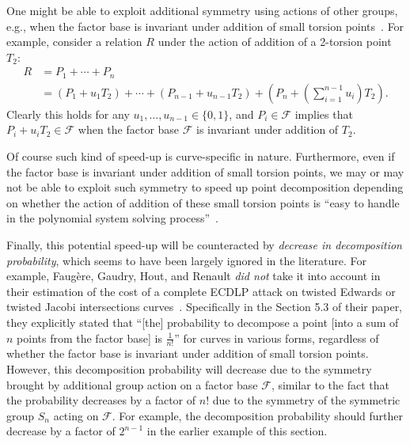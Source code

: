 One might be able to exploit additional symmetry using actions of
other groups, e.g., when the factor base is invariant under addition
of small torsion points~\cite{DBLP:conf/eurocrypt/FaugereHJRV14}.
%
For example, consider a relation $R$ under the action of addition of a
2-torsion point $T_2$:
\begin{align*}
  R & = P_1+\cdots+P_n \\
    & =
      (P_1+u_1T_2)+\cdots+(P_{n-1}+u_{n-1}T_2)+\left(P_n+\left(\sum_{i=1}^{n-1}u_i\right)T_2\right).
\end{align*}
%
Clearly this holds for any $u_1,\ldots,u_{n-1}\in\{0,1\}$, and
$P_i\in\mathcal F$ implies that $P_i+u_iT_2\in\mathcal F$ when the
factor base $\mathcal F$ is invariant under addition of $T_2$.

Of course such kind of speed-up is curve-specific in nature.
%
Furthermore, even if the factor base is invariant under addition of
small torsion points, we may or may not be able to exploit such
symmetry to speed up point decomposition depending on whether the
action of addition of these small torsion points is ``easy to handle
in the polynomial system solving
process''~\cite{DBLP:conf/eurocrypt/FaugereHJRV14}.

Finally, this potential speed-up will be counteracted by
\emph{decrease in decomposition probability}, which seems to have been
largely ignored in the literature.
%
For example, Faug\`ere, Gaudry, Hout, and Renault \emph{did not} take
it into account in their estimation of the cost of a complete ECDLP
attack on twisted Edwards or twisted Jacobi intersections
curves~\cite{DBLP:conf/eurocrypt/FaugereHJRV14}.
%
Specifically in the Section 5.3 of their paper, they explicitly stated
that ``[the] probability to decompose a point [into a sum of $n$
points from the factor base] is $\frac{1}{n!}$'' for curves in various
forms, regardless of whether the factor base is invariant under
addition of small torsion points.
%
However, this decomposition probability will decrease due to the
symmetry brought by additional group action on a factor base
$\mathcal F$, similar to the fact that the probability decreases by a
factor of $n!$ due to the symmetry of the symmetric group $S_n$ acting
on $\mathcal F$.
%
For example, the decomposition probability should further decrease by
a factor of $2^{n-1}$ in the earlier example of this section.
